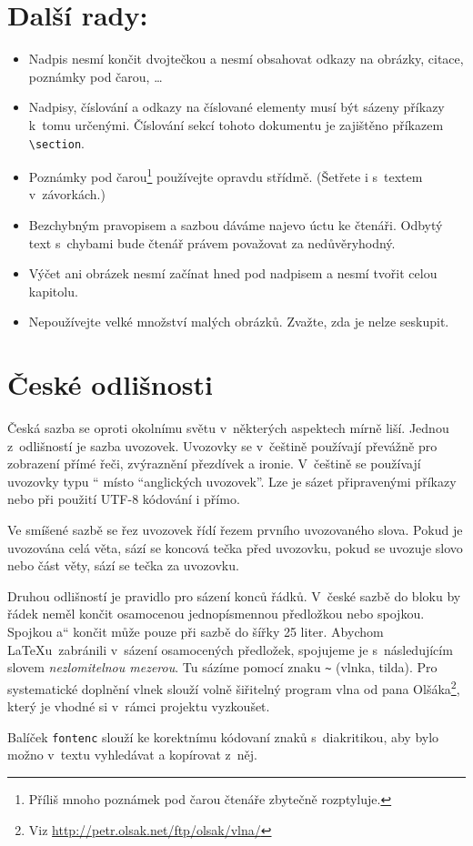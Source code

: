 \documentclass[a4paper, 10pt, twocolumn]{article}
\providecommand{\uv}[1]{\quotedblbase#1\textquotedblleft}
\begin{document}
\section{Další rady:}\label{sec:rady}

\begin{itemize}

\item Nadpis nesmí končit dvojtečkou a nesmí obsahovat odkazy na obrázky, citace, poznámky pod čarou, \dots
\item Nadpisy, číslování a odkazy na číslované elementy musí být sázeny příkazy k~tomu určenými.
Číslování sekcí tohoto dokumentu je zajištěno příkazem \verb|\section|.
\item Poznámky pod čarou\footnote{Příliš mnoho poznámek pod čarou čtenáře zbytečně rozptyluje.} používejte opravdu střídmě.
(Šetřete i s~textem v~závorkách.)
\item Bezchybným pravopisem a sazbou dáváme najevo úctu ke čtenáři.
Odbytý text s~chybami bude čtenář právem považovat za nedůvěryhodný.
\item Výčet ani obrázek nesmí začínat hned pod nadpisem a nesmí tvořit celou kapitolu.
\item Nepoužívejte velké množství malých obrázků.
Zvažte, zda je nelze seskupit.

\end{itemize}

\section{České odlišnosti}

Česká sazba se oproti okolnímu světu v~některých aspektech mírně liší.
Jednou z~odlišností je sazba uvozovek.
Uvozovky se v~češtině používají převážně pro zobrazení přímé řeči, zvýraznění přezdívek a ironie.
V~češtině se používají uvozovky typu \uv{9966} místo ``anglických uvozovek''.
Lze je sázet připravenými příkazy nebo při použití UTF-8 kódování i přímo.
\par Ve smíšené sazbě se řez uvozovek řídí řezem prvního uvozovaného slova.
Pokud je uvozována celá věta, sází se koncová tečka před uvozovku, pokud se uvozuje slovo nebo část věty, sází se tečka za uvozovku.
\par Druhou odlišností je pravidlo pro sázení konců řádků.
V~české sazbě do bloku by řádek neměl končit osamocenou jednopísmennou předložkou nebo spojkou.
Spojkou \uv{a} končit může pouze při sazbě do šířky 25 liter.
Abychom \LaTeX u~zabránili v~sázení osamocených předložek, spojujeme je s~následujícím slovem \emph{nezlomitelnou mezerou}.
Tu sázíme pomocí znaku \verb|~| (vlnka, tilda).
Pro systematické doplnění vlnek slouží volně šiřitelný program vlna od pana Olšáka\footnote{Viz \url{http://petr.olsak.net/ftp/olsak/vlna/}}, který je vhodné si v~rámci projektu vyzkoušet.
\par Balíček \texttt{fontenc} slouží ke korektnímu kódovaní znaků s~diakritikou, aby bylo možno v~textu vyhledávat a kopírovat z~něj.
\end{document}
